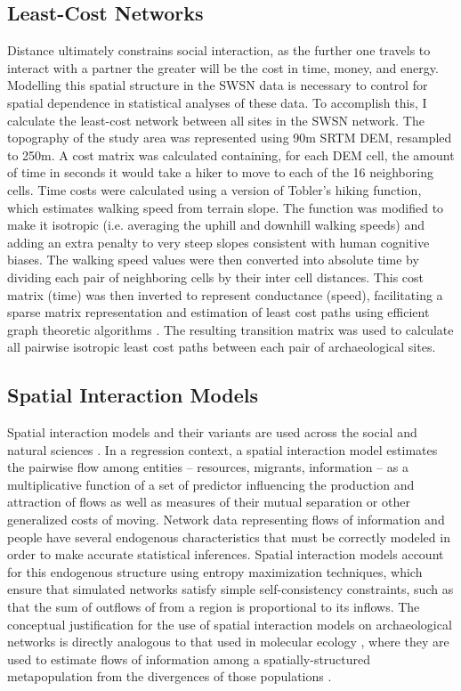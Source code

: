 \documentclass[10pt]{iopart}
\begin{document}
\subsection*{Least-Cost Networks}
Distance ultimately constrains social interaction, as the further one travels to interact with a partner the greater will be the cost in time, money, and energy. Modelling this spatial structure in the SWSN data is necessary to control for spatial dependence in statistical analyses of these data. To accomplish this, I calculate the least-cost network between all sites in the SWSN network. The topography of the study area was represented using 90m SRTM DEM, resampled to 250m. A cost matrix was calculated containing, for each DEM cell, the amount of time in seconds it would take a hiker to move to each of the 16 neighboring cells. Time costs were calculated using a version of Tobler's hiking function, which estimates walking speed from terrain slope. The function was modified to make it isotropic (i.e. averaging the uphill and downhill walking speeds) and adding an extra penalty to very steep slopes consistent with human cognitive biases. The walking speed values were then converted into absolute time by dividing each pair of neighboring cells by their inter cell distances. This cost matrix (time) was then inverted to represent conductance (speed), facilitating a sparse matrix representation and estimation of least cost paths using efficient graph theoretic algorithms \parencite{Etten2014}. The resulting transition matrix was used to calculate all pairwise isotropic least cost paths between each pair of archaeological sites. 

\subsection*{Spatial Interaction Models}
Spatial interaction models and their variants are used across the social and natural sciences \parencite{Wilson1971,Fotheringham1989,Sen1995,Bavaud2008,Murphy2010,Head2015}. In a regression context, a spatial interaction model estimates the pairwise flow among entities -- resources, migrants, information --  as a multiplicative function of a set of predictor influencing the production and attraction of flows as well as measures of their mutual separation or other generalized costs of moving. Network data representing flows of information and people have several endogenous characteristics that must be correctly modeled in order to make accurate statistical inferences. Spatial interaction models account for this endogenous structure using entropy maximization techniques, which ensure that simulated networks satisfy simple self-consistency constraints, such as that the sum of outflows of from a region is proportional to its inflows. The conceptual justification for the use of spatial interaction models on archaeological networks is directly analogous to that used in molecular ecology \parencite{Murphy2010}, where they are used to estimate flows of information among a spatially-structured metapopulation from the divergences of those populations \parencite{Mesoudi2018}. 
\end{document}

